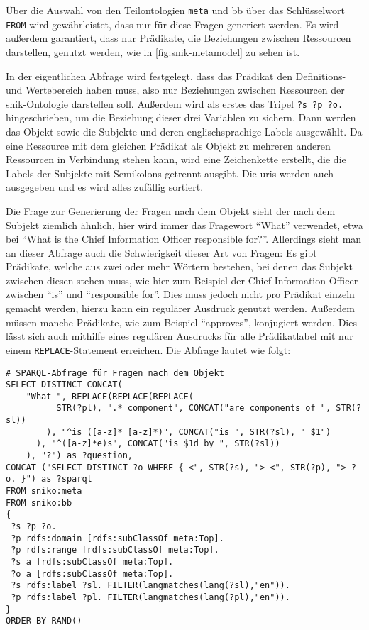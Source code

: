 Über die Auswahl von den Teilontologien \texttt{meta} und {bb} über das Schlüsselwort \texttt{FROM} wird gewährleistet, dass nur für diese Fragen generiert werden.
Es wird außerdem garantiert, dass nur Prädikate, die Beziehungen zwischen Ressourcen darstellen, genutzt werden, wie in \cref{fig:snik-metamodel} zu sehen ist.

In der eigentlichen Abfrage wird festgelegt, dass das Prädikat den Definitions- und Wertebereich   haben muss, also nur Beziehungen zwischen Ressourcen der \ac{snik}-Ontologie darstellen soll.
Außerdem wird als erstes das Tripel \texttt{?s ?p ?o.} hingeschrieben, um die Beziehung dieser drei Variablen zu sichern.
Dann werden das Objekt sowie die Subjekte und deren englischsprachige Labels ausgewählt.
Da eine Ressource mit dem gleichen Prädikat als Objekt zu mehreren anderen Ressourcen in Verbindung stehen kann, wird eine Zeichenkette erstellt, die die Labels der Subjekte mit Semikolons getrennt ausgibt.
Die \acp{uri} werden auch ausgegeben und es wird alles zufällig sortiert.

Die Frage zur Generierung der Fragen nach dem Objekt sieht der nach dem Subjekt ziemlich ähnlich, hier wird immer das Fragewort \enquote{What} verwendet, etwa bei \enquote{What is the Chief Information Officer responsible for?}.
Allerdings sieht man an dieser Abfrage auch die Schwierigkeit dieser Art von Fragen:
Es gibt Prädikate, welche aus zwei oder mehr Wörtern bestehen, bei denen das Subjekt zwischen diesen stehen muss, wie hier zum Beispiel der Chief Information Officer zwischen \enquote{is} und \enquote{responsible for}.
Dies muss jedoch nicht pro Prädikat einzeln gemacht werden, hierzu kann ein regulärer Ausdruck genutzt werden.
Außerdem müssen manche Prädikate, wie zum Beispiel \enquote{approves}, konjugiert werden.
Dies lässt sich auch mithilfe eines regulären Ausdrucks für alle Prädikatlabel mit nur einem \texttt{REPLACE}-Statement erreichen.
Die Abfrage lautet wie folgt:
\begin{lstlisting}[language=SPARQL]
# SPARQL-Abfrage für Fragen nach dem Objekt
SELECT DISTINCT CONCAT(
    "What ", REPLACE(REPLACE(REPLACE(
          STR(?pl), ".* component", CONCAT("are components of ", STR(?sl))
        ), "^is ([a-z]* [a-z]*)", CONCAT("is ", STR(?sl), " $1")
      ), "^([a-z]*e)s", CONCAT("is $1d by ", STR(?sl))
    ), "?") as ?question,
CONCAT ("SELECT DISTINCT ?o WHERE { <", STR(?s), "> <", STR(?p), "> ?o. }") as ?sparql
FROM sniko:meta
FROM sniko:bb
{
 ?s ?p ?o.
 ?p rdfs:domain [rdfs:subClassOf meta:Top].
 ?p rdfs:range [rdfs:subClassOf meta:Top].
 ?s a [rdfs:subClassOf meta:Top].
 ?o a [rdfs:subClassOf meta:Top].
 ?s rdfs:label ?sl. FILTER(langmatches(lang(?sl),"en")).
 ?p rdfs:label ?pl. FILTER(langmatches(lang(?pl),"en")).
}
ORDER BY RAND()
\end{lstlisting}

